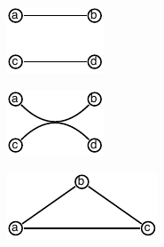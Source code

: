 \begin{figure}[H]
    \centering
    \begin{subfigure}{0.20\linewidth}
        \centering
        \includegraphics[width=0.9\linewidth]{figures/amb/amb_0.pdf}
        \caption{}
        \label{fig:amb_0}
    \end{subfigure}
    \begin{subfigure}{0.20\linewidth}
        \centering
        \includegraphics[width=0.9\linewidth]{figures/amb/amb_1.pdf}
        \caption{}
        \label{fig:amb_1}
    \end{subfigure}
    \begin{subfigure}{0.29\linewidth}
        \centering
        \includegraphics[width=\linewidth]{figures/amb/amb_2.pdf}

\end{subfigure}
\end{figure}
